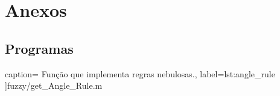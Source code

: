 \newpage
\section{Anexos}
\subsection{Programas}

 caption={
Função que implementa regras nebulosas.},
label={lst:angle_rule} ]{fuzzy/get_Angle_Rule.m}
 